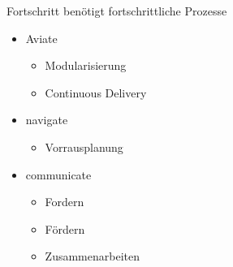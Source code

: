 

\begin{frame}[light]{Fortschritt benötigt fortschrittliche Prozesse}

  \begin{itemize}
    \item Aviate %
    \begin{itemize}
      \item Modularisierung
      \item Continuous Delivery
    \end{itemize}
    \item navigate %
    \begin{itemize}
      \item Vorrausplanung
    \end{itemize}
    \item communicate %
    \begin{itemize}
      \item Fordern
      \item Fördern
      \item Zusammenarbeiten
    \end{itemize}
  \end{itemize}
\end{frame}





